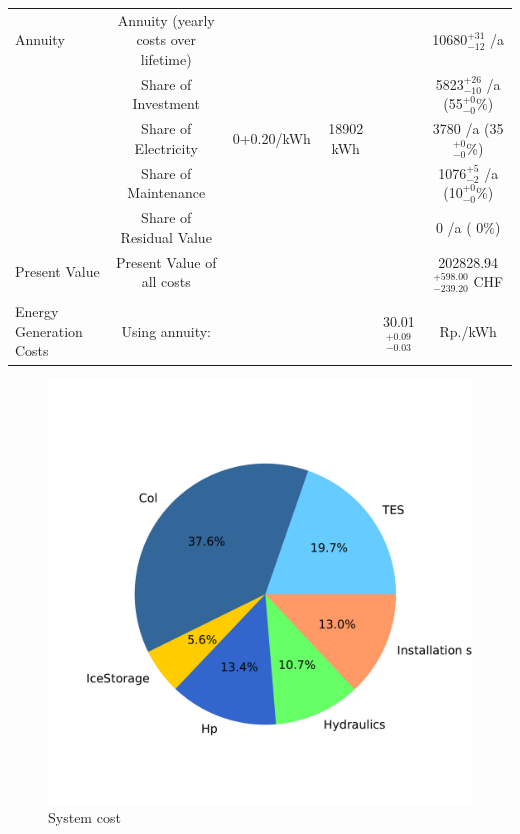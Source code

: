 \documentclass[english]{SPFShortReport}
\begin{document}
\begin{table}[!ht]
\begin{adjustbox}{max width =\textwidth}
\begin{tabular}{l | c c c c c }
Annuity & Annuity (yearly costs over lifetime)  &&& & 10680$^{\mathrm{+31}}_{\mathrm{-12}}$ /a  \\
 & Share of Investment & &&& 5823$^{\mathrm{+26}}_{\mathrm{-10}}$ /a (55$^{\mathrm{+ 0}}_{\mathrm{- 0}}$\%) \\
 & Share of Electricity & 0+0.20/kWh & 18902 kWh &  & 3780 /a (35$^{\mathrm{+ 0}}_{\mathrm{- 0}}$\%)\\
 & Share of Maintenance & &&& 1076$^{\mathrm{+ 5}}_{\mathrm{- 2}}$ /a (10$^{\mathrm{+ 0}}_{\mathrm{- 0}}$\%)\\ 
 & Share of Residual Value &&& &  0 /a ( 0\%)\\
Present Value  & Present Value of all costs  & &&& 202828.94$^{\mathrm{+598.00}}_{\mathrm{-239.20}}$ CHF \\
\hline \\ 
 Energy Generation Costs & Using annuity: &&& 30.01$^{\mathrm{+0.09}}_{\mathrm{-0.03}}$ & Rp./kWh \\
\hline
\hline
\end{tabular}
\end{adjustbox}
\label{CostsTable}
\end{table}
\begin{figure}[!htbp]
\begin{center}
\includegraphics[width=1\textwidth]{costShare-HydD_mfb30_ideal_dryN-CityBAS_dryNAc1.0x35.659Vice0.2x35.659HP1.0x17.109-Year0.pdf}
\caption{System cost}
\label{systemCost}
\end{center}
\end{figure}
\end{document}
